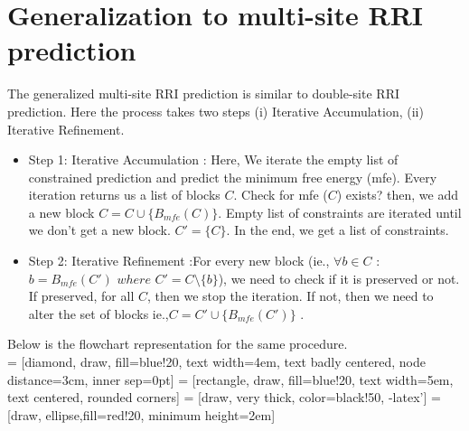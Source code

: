 \documentclass[twoside,a4paper]{report}
\numberwithin{equation}{section}
\begin{document}
	\section{Generalization to multi-site RRI prediction}
	
	The generalized multi-site RRI prediction is similar to double-site RRI prediction. Here the process takes two steps (i) Iterative Accumulation, (ii) Iterative Refinement.\\
	 \begin{itemize}
	
	\item Step 1: Iterative Accumulation : Here, We iterate the empty list of constrained prediction and predict the minimum free energy (mfe). Every iteration returns us a list of blocks $C$. Check for mfe ($C$) exists? then, we add a new block $C=C \cup \{B_{mfe}(C)\}$. Empty list of constraints are iterated until we don't get a new block. $C' = \{C\}$. In the end, we get a list of constraints.
	\item Step 2: Iterative Refinement :For every new block (ie., $\forall b \in C$ : $b= B_{mfe}(C')$ $where$ $C'=C\setminus\{b\}$), we need to check if it is preserved or not. If preserved, for all $C$, then we stop the iteration. If not, then we need to alter the set of blocks ie.,$C=C' \cup \{B_{mfe} (C')\}$ .
	
\end{itemize}

Below is the flowchart representation for the same procedure.\\

 = [diamond, draw, fill=blue!20, 
text width=4em, text badly centered, node distance=3cm, inner sep=0pt]
 = [rectangle, draw, fill=blue!20, 
text width=5em, text centered, rounded corners]
 = [draw, very thick, color=black!50, -latex']
 = [draw, ellipse,fill=red!20,
minimum height=2em]
\end{document}
